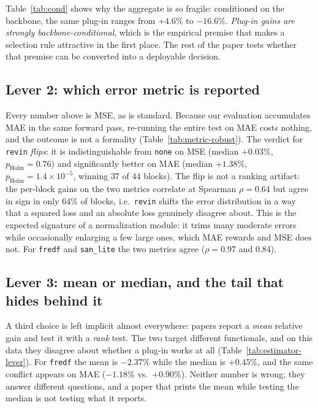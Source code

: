 \documentclass[a4paper,fleqn]{cas-sc}
\newcommand{\arm}[1]{\texttt{#1}}
\begin{document}
Table~\ref{tab:cond} shows why the aggregate is so fragile: conditioned on the
backbone, the same plug-in ranges from $+4.6\%$ to $-16.6\%$. \emph{Plug-in
gains are strongly backbone-conditional}, which is the empirical premise that
makes a selection rule attractive in the first place. The rest of the paper
tests whether that premise can be converted into a deployable decision.

\subsection{Lever 2: which error metric is reported}

Every number above is MSE, as is standard. Because our evaluation accumulates
MAE in the same forward pass, re-running the entire test on MAE costs nothing,
and the outcome is not a formality (Table~\ref{tab:metric-robust}). The verdict
for \arm{revin} \emph{flips}: it is indistinguishable from \arm{none} on MSE
(median $+0.03\%$, $p_\text{Holm}{=}0.76$) and significantly better on MAE
(median $+1.38\%$, $p_\text{Holm}{=}1.4\!\times\!10^{-5}$, winning $37$ of $44$
blocks). The flip is not a ranking artifact: the per-block gains on the two
metrics correlate at Spearman $\rho{=}0.64$ but agree in sign in only $64\%$ of
blocks, i.e.\ \arm{revin} shifts the error distribution in a way that a squared
loss and an absolute loss genuinely disagree about. This is the expected
signature of a normalization module: it trims many moderate errors while
occasionally enlarging a few large ones, which MAE rewards and MSE does not.
For \arm{fredf} and \arm{san\_lite} the two metrics agree
($\rho{=}0.97$ and $0.84$).



\subsection{Lever 3: mean or median, and the tail that hides behind it}

A third choice is left implicit almost everywhere: papers report a \emph{mean}
relative gain and test it with a \emph{rank} test. The two target different
functionals, and on this data they disagree about whether a plug-in works at all
(Table~\ref{tab:estimator-lever}). For \arm{fredf} the mean is $-2.37\%$ while
the median is $+0.45\%$, and the same conflict appears on MAE ($-1.18\%$ vs.\
$+0.90\%$). Neither number is wrong; they answer different questions, and a
paper that prints the mean while testing the median is not testing what it
reports.
\end{document}
